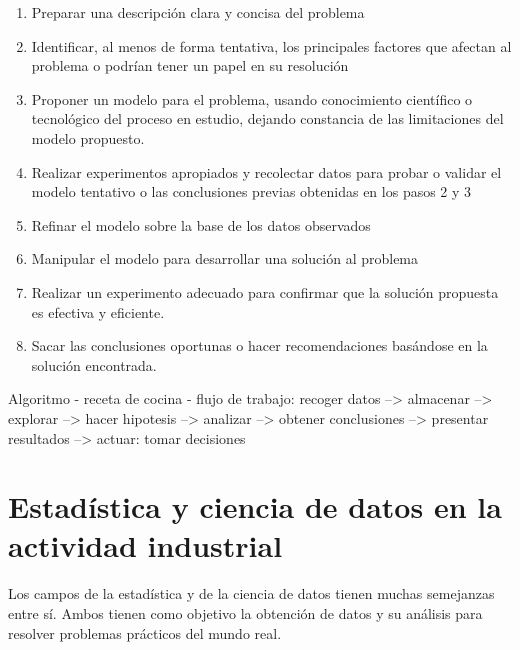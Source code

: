 \documentclass[
  letterpaper,
]{scrbook}
\providecommand{\tightlist}{%
  \setlength{\itemsep}{0pt}\setlength{\parskip}{0pt}}\usepackage{longtable,booktabs,array}
\begin{document}
\begin{enumerate}
\def\labelenumi{\arabic{enumi}.}
\tightlist
\item
  Preparar una descripción clara y concisa del problema
\item
  Identificar, al menos de forma tentativa, los principales factores que
  afectan al problema o podrían tener un papel en su resolución
\item
  Proponer un modelo para el problema, usando conocimiento científico o
  tecnológico del proceso en estudio, dejando constancia de las
  limitaciones del modelo propuesto.
\item
  Realizar experimentos apropiados y recolectar datos para probar o
  validar el modelo tentativo o las conclusiones previas obtenidas en
  los pasos 2 y 3
\item
  Refinar el modelo sobre la base de los datos observados
\item
  Manipular el modelo para desarrollar una solución al problema
\item
  Realizar un experimento adecuado para confirmar que la solución
  propuesta es efectiva y eficiente.
\item
  Sacar las conclusiones oportunas o hacer recomendaciones basándose en
  la solución encontrada.
\end{enumerate}

{}

Algoritmo - receta de cocina - flujo de trabajo: recoger datos
--\textgreater{} almacenar --\textgreater{} explorar --\textgreater{}
hacer hipotesis --\textgreater{} analizar --\textgreater{} obtener
conclusiones --\textgreater{} presentar resultados --\textgreater{}
actuar: tomar decisiones

\hypertarget{estaduxedstica-y-ciencia-de-datos-en-la-actividad-industrial}{%
\section{Estadística y ciencia de datos en la actividad
industrial}\label{estaduxedstica-y-ciencia-de-datos-en-la-actividad-industrial}}

Los campos de la estadística y de la ciencia de datos tienen muchas
semejanzas entre sí. Ambos tienen como objetivo la obtención de datos y
su análisis para resolver problemas prácticos del mundo real.
\end{document}
